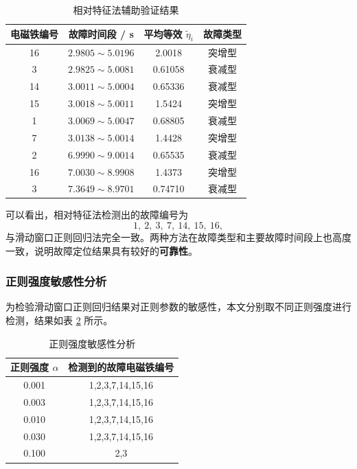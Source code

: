 \documentclass[a4paper]{nmmcm}
\begin{document}
\FloatBarrier
\begin{table}[H]
\centering
\caption{相对特征法辅助验证结果}
\label{tab:q4_relative_result}
\small
\renewcommand{\arraystretch}{1.25}
\setlength{\tabcolsep}{8pt}
\begin{tabular}{c c c c}
\toprule
电磁铁编号 & 故障时间段 / s & 平均等效 $\tilde{\eta}_i$ & 故障类型 \\
\midrule
16 & $2.9805\sim5.0196$ & 2.0018  & 突增型 \\
3  & $2.9825\sim5.0081$ & 0.61058 & 衰减型 \\
14 & $3.0011\sim5.0004$ & 0.65336 & 衰减型 \\
15 & $3.0018\sim5.0011$ & 1.5424  & 突增型 \\
1  & $3.0069\sim5.0047$ & 0.68805 & 衰减型 \\
7  & $3.0138\sim5.0014$ & 1.4428  & 突增型 \\
2  & $6.9990\sim9.0014$ & 0.65535 & 衰减型 \\
16 & $7.0030\sim8.9908$ & 1.4373  & 突增型 \\
3  & $7.3649\sim8.9701$ & 0.74710 & 衰减型 \\
\bottomrule
\end{tabular}
\end{table}
\FloatBarrier

可以看出，相对特征法检测出的故障编号为
\[
1,\ 2,\ 3,\ 7,\ 14,\ 15,\ 16,
\]
与滑动窗口正则回归法完全一致。两种方法在故障类型和主要故障时间段上也高度一致，说明故障定位结果具有较好的\textbf{可靠性}。

\subsubsection{正则强度敏感性分析}

为检验滑动窗口正则回归结果对正则参数的敏感性，本文分别取不同正则强度进行检测，结果如表 \ref{tab:q4_alpha} 所示。

\FloatBarrier
\begin{table}[H]
\centering
\caption{正则强度敏感性分析}
\label{tab:q4_alpha}
\small
\renewcommand{\arraystretch}{1.25}
\begin{tabular}{c c}
\toprule
正则强度 $\alpha$ & 检测到的故障电磁铁编号 \\
\midrule
0.001 & 1,2,3,7,14,15,16 \\
0.003 & 1,2,3,7,14,15,16 \\
0.010 & 1,2,3,7,14,15,16 \\
0.030 & 1,2,3,7,14,15,16 \\
0.100 & 2,3 \\
\bottomrule
\end{tabular}
\end{table}
\FloatBarrier
\end{document}
